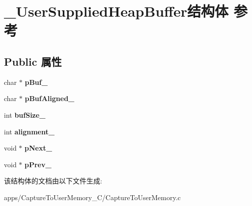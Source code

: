 \hypertarget{struct___user_supplied_heap_buffer}{\section{\+\_\+\+User\+Supplied\+Heap\+Buffer结构体 参考}
\label{struct___user_supplied_heap_buffer}
}
\subsection*{Public 属性}
\begin{DoxyCompactItemize}
\item 
\hypertarget{struct___user_supplied_heap_buffer_af21374a51c2abd9eeee1f3759bc9138f}{char $\ast$ {\bfseries p\+Buf\+\_\+}}\label{struct___user_supplied_heap_buffer_af21374a51c2abd9eeee1f3759bc9138f}

\item 
\hypertarget{struct___user_supplied_heap_buffer_ae3b1ee38597e1a3fce9424630bafbfcd}{char $\ast$ {\bfseries p\+Buf\+Aligned\+\_\+}}\label{struct___user_supplied_heap_buffer_ae3b1ee38597e1a3fce9424630bafbfcd}

\item 
\hypertarget{struct___user_supplied_heap_buffer_a2a15363294307ebb738aa260a78ae90c}{int {\bfseries buf\+Size\+\_\+}}\label{struct___user_supplied_heap_buffer_a2a15363294307ebb738aa260a78ae90c}

\item 
\hypertarget{struct___user_supplied_heap_buffer_a702fb6de8aa07f2c5c3adc58ec29a3ce}{int {\bfseries alignment\+\_\+}}\label{struct___user_supplied_heap_buffer_a702fb6de8aa07f2c5c3adc58ec29a3ce}

\item 
\hypertarget{struct___user_supplied_heap_buffer_a437d02c0879a21aaa7380684ede4f02e}{void $\ast$ {\bfseries p\+Next\+\_\+}}\label{struct___user_supplied_heap_buffer_a437d02c0879a21aaa7380684ede4f02e}

\item 
\hypertarget{struct___user_supplied_heap_buffer_a20f7ec558b8176781487f18b0c840114}{void $\ast$ {\bfseries p\+Prev\+\_\+}}\label{struct___user_supplied_heap_buffer_a20f7ec558b8176781487f18b0c840114}

\end{DoxyCompactItemize}


该结构体的文档由以下文件生成\+:\begin{DoxyCompactItemize}
\item 
apps/\+Capture\+To\+User\+Memory\+\_\+\+C/Capture\+To\+User\+Memory.\+c\end{DoxyCompactItemize}
